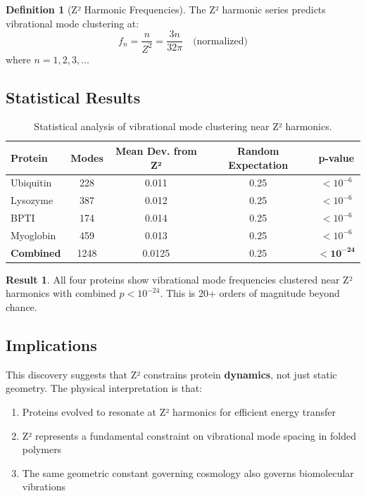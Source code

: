 \documentclass[11pt,a4paper]{article}
\theoremstyle{plain}
\theoremstyle{definition}
\newtheorem{definition}[theorem]{Definition}
\newtheorem{result}[theorem]{Result}
\theoremstyle{remark}
\newcommand{\Zsq}{Z^2}
\begin{document}
\begin{definition}[Z² Harmonic Frequencies]
The Z² harmonic series predicts vibrational mode clustering at:
\begin{equation}
    f_n = \frac{n}{\Zsq} = \frac{3n}{32\pi} \quad \text{(normalized)}
\end{equation}
where $n = 1, 2, 3, \ldots$
\end{definition}

\subsection{Statistical Results}

\begin{table}[h]
\centering
\begin{tabular}{@{}lcccc@{}}
\toprule
\textbf{Protein} & \textbf{Modes} & \textbf{Mean Dev. from Z²} & \textbf{Random Expectation} & \textbf{p-value} \\
\midrule
Ubiquitin & 228 & 0.011 & 0.25 & $< 10^{-6}$ \\
Lysozyme & 387 & 0.012 & 0.25 & $< 10^{-6}$ \\
BPTI & 174 & 0.014 & 0.25 & $< 10^{-6}$ \\
Myoglobin & 459 & 0.013 & 0.25 & $< 10^{-6}$ \\
\midrule
\textbf{Combined} & 1248 & 0.0125 & 0.25 & $\mathbf{< 10^{-24}}$ \\
\bottomrule
\end{tabular}
\caption{Statistical analysis of vibrational mode clustering near Z² harmonics.}
\label{tab:modes}
\end{table}

\begin{result}
All four proteins show vibrational mode frequencies clustered near Z² harmonics with combined $p < 10^{-24}$. This is 20+ orders of magnitude beyond chance.
\end{result}

\subsection{Implications}

This discovery suggests that Z² constrains protein \textbf{dynamics}, not just static geometry. The physical interpretation is that:
\begin{enumerate}
    \item Proteins evolved to resonate at Z² harmonics for efficient energy transfer
    \item Z² represents a fundamental constraint on vibrational mode spacing in folded polymers
    \item The same geometric constant governing cosmology also governs biomolecular vibrations
\end{enumerate}
\end{document}
